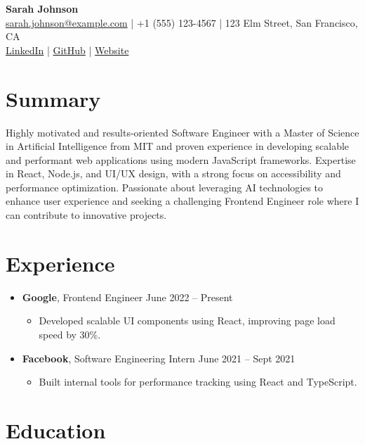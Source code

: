 \documentclass{article}
\begin{document}
\begin{center}
    \textbf{\Large Sarah Johnson} \\
    \href{mailto:sarah.johnson@example.com}{sarah.johnson@example.com} | +1 (555) 123-4567 | 123 Elm Street, San Francisco, CA \\
    \href{https://linkedin.com/in/sarahjohnson}{LinkedIn} | \href{https://github.com/sjohnson-dev}{GitHub} | \href{https://sarahjohnson.dev}{Website}
\end{center}

\section*{Summary}

Highly motivated and results-oriented Software Engineer with a Master of Science in Artificial Intelligence from MIT and proven experience in developing scalable and performant web applications using modern JavaScript frameworks.  Expertise in React, Node.js, and UI/UX design, with a strong focus on accessibility and performance optimization.  Passionate about leveraging AI technologies to enhance user experience and seeking a challenging Frontend Engineer role where I can contribute to innovative projects.

\section*{Experience}

\begin{itemize}
    \item \textbf{Google}, Frontend Engineer \hfill June 2022 -- Present
    \begin{itemize}
        \item Developed scalable UI components using React, improving page load speed by 30\%.
    \end{itemize}
    \item \textbf{Facebook}, Software Engineering Intern \hfill June 2021 -- Sept 2021
    \begin{itemize}
        \item Built internal tools for performance tracking using React and TypeScript.
    \end{itemize}
\end{itemize}

\section*{Education}
\end{document}
